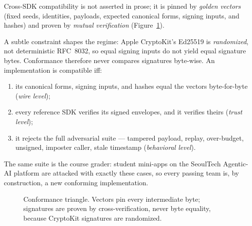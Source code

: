 \documentclass[10pt,twocolumn]{article}
\newcommand{\field}[1]{\texttt{#1}}
\begin{document}
Cross-SDK compatibility is not asserted in prose; it is pinned by
\emph{golden vectors} (fixed seeds, identities, payloads, expected
canonical forms, signing inputs, and hashes) and proven by \emph{mutual
verification} (Figure~\ref{fig:conformance}).

A subtle constraint shapes the regime: Apple CryptoKit's Ed25519 is
\emph{randomized}, not deterministic RFC~8032, so equal signing inputs do
not yield equal signature bytes. Conformance therefore never compares
signatures byte-wise. An implementation is compatible iff:
\begin{enumerate}[leftmargin=1.4em,itemsep=1pt]
  \item its canonical forms, signing inputs, and hashes equal the vectors
        byte-for-byte (\emph{wire level});
  \item every reference SDK verifies its signed envelopes, and it verifies
        theirs (\emph{trust level});
  \item it rejects the full adversarial suite --- tampered payload, replay,
        over-budget, unsigned, imposter caller, stale timestamp
        (\emph{behavioral level}).
\end{enumerate}
The same suite is the course grader: student mini-apps on the SeoulTech
Agentic-AI platform are attacked with exactly these cases, so every
passing team is, by construction, a new conforming implementation.

\begin{figure}[t]
\centering
{}
\caption{Conformance triangle. Vectors pin every intermediate byte;
signatures are proven by cross-verification, never byte equality, because
CryptoKit signatures are randomized.}
\label{fig:conformance}
\end{figure}
\end{document}
